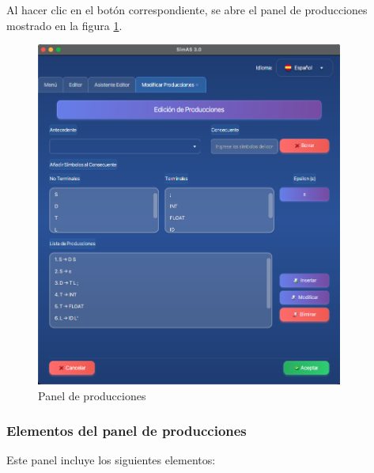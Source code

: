 Al hacer clic en el botón correspondiente, se abre el panel de producciones mostrado en la figura \ref{fig:panel_producciones}.

\needspace{8cm}
\begin{figure}[H]
    \centering
    \includegraphics[width=0.9\textwidth]{figuras/editor/panel_producciones.png}
    \caption{Panel de producciones}
    \label{fig:panel_producciones}
\end{figure}

\subsubsection{Elementos del panel de producciones}

Este panel incluye los siguientes elementos:

